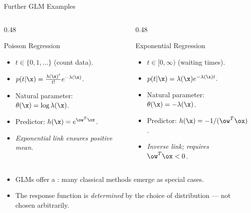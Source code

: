 \begin{frame}{Further GLM Examples}
  \begin{columns}[T]
    \begin{column}{0.48\textwidth}
      \begin{block}{Poisson Regression}
        \begin{itemize}
          \item $t \in \{0,1,\ldots\}$ (count data).
          \item $p(t|\x) = \frac{\lambda(\x)^t}{t!}e^{-\lambda(\x)}$.
          \item Natural parameter: $\theta(\x) = \log\lambda(\x)$.
          \item Predictor: $h(\x) = e^{\ow^T\ox}$.
          \item \textit{Exponential link ensures positive mean.}
        \end{itemize}
      \end{block}
    \end{column}
    \begin{column}{0.48\textwidth}
      \begin{block}{Exponential Regression}
        \begin{itemize}
          \item $t \in [0,\infty)$ (waiting times).
          \item $p(t|\x) = \lambda(\x)e^{-\lambda(\x)t}$.
          \item Natural parameter: $\theta(\x) = -\lambda(\x)$.
          \item Predictor: $h(\x) = -1/(\ow^T\ox)$.
          \item \textit{Inverse link; requires $\ow^T\ox < 0$.}
        \end{itemize}
      \end{block}
    \end{column}
  \end{columns}
  \vspace{0.3cm}
  \begin{itemize}
    \item GLMs offer a : many classical methods emerge as special cases.
    \item The response function is \emph{determined} by the choice of distribution — not chosen arbitrarily.
  \end{itemize}
\end{frame}


